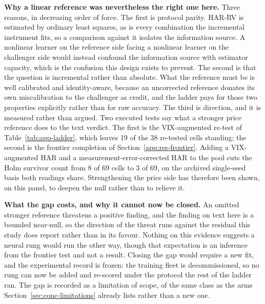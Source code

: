\textbf{Why a linear reference was nevertheless the right one here.} Three
reasons, in decreasing order of force. The first is protocol parity. HAR-RV is
estimated by ordinary least squares, as is every combination the incremental
instrument fits, so a comparison against it isolates the information source. A
nonlinear learner on the reference side facing a nonlinear learner on the
challenger side would instead confound the information source with estimator
capacity, which is the confusion this design exists to prevent. The
second is that the question is incremental rather than absolute. What the
reference must be is well calibrated and identity-aware, because an uncorrected
reference donates its own miscalibration to the challenger as credit, and the
ladder pays for those two properties explicitly rather than for raw accuracy.
The third is direction, and it is measured rather than argued. Two executed
tests say what a stronger price reference does to the text verdict. The first is
the VIX-augmented re-test of Table~\ref{tab:app-ladder}, which leaves 19 of the 38
re-tested cells standing; the second is the frontier completion of
Section~\ref{app:res-frontier}.
Adding a VIX-augmented HAR and a
measurement-error-corrected HAR to the pool cuts the Holm survivor count from 8
of 69 cells to 3 of 69, on the archived single-seed basis both readings share. %
Strengthening the price side has therefore been shown, on this panel, to deepen
the null rather than to relieve it.

\textbf{What the gap costs, and why it cannot now be closed.} An omitted stronger
reference threatens a positive finding, and the finding on text here is a bounded
near-null, so the direction of the threat runs against the residual this study
does report rather than in its favour. Nothing on this evidence suggests a neural
rung would run the other way, though that expectation is an inference from the
frontier test and not a result. Closing the gap would require a new fit, and the
experimental record is frozen: the training fleet is decommissioned, so no rung
can now be added and re-scored under the protocol the rest of the ladder ran.
The gap is recorded as a limitation of scope, of the same class as the arms
Section~\ref{sec:conc-limitations} already lists rather than a new one.
